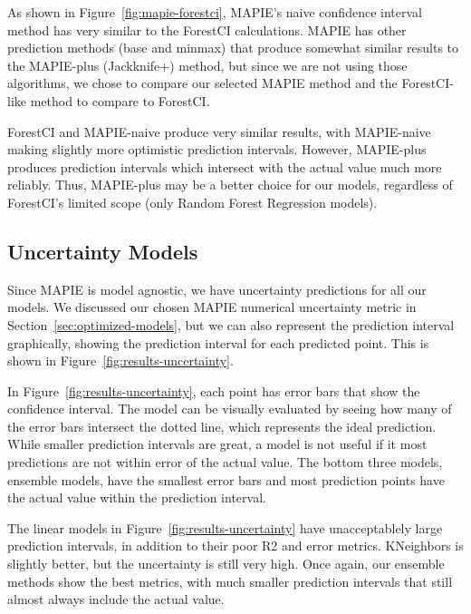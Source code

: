 \documentclass[twocolumn, nofootinbib, secnumarabic, amssymb, nobibnotes, aps, prd]{revtex4-2}
\begin{document}
As shown in Figure~\ref{fig:mapie-forestci}, MAPIE's naive confidence interval method has very similar to the ForestCI calculations. MAPIE has other prediction methods (base and minmax) that produce somewhat similar results to the MAPIE-plus (Jackknife+) method, but since we are not using those algorithms, we chose to compare our selected MAPIE method and the ForestCI-like method to compare to ForestCI.

ForestCI and MAPIE-naive produce very similar results, with MAPIE-naive making slightly more optimistic prediction intervals. However, MAPIE-plus produces prediction intervals which intersect with the actual value much more reliably. Thus, MAPIE-plus may be a better choice for our models, regardless of ForestCI's limited scope (only Random Forest Regression models).

\subsection{Uncertainty Models}
Since MAPIE is model agnostic, we have uncertainty predictions for all our models. We discussed our chosen MAPIE numerical uncertainty metric in Section~\ref{sec:optimized-models}, but we can also represent the prediction interval graphically, showing the prediction interval for each predicted point. This is shown in Figure~\ref{fig:results-uncertainty}.

In Figure~\ref{fig:results-uncertainty}, each point has error bars that show the confidence interval. The model can be visually evaluated by seeing how many of the error bars intersect the dotted line, which represents the ideal prediction. While smaller prediction intervals are great, a model is not useful if it most predictions are not within error of the actual value. The bottom three models, ensemble models, have the smallest error bars and most prediction points have the actual value within the prediction interval. 

The linear models in Figure~\ref{fig:results-uncertainty} have unacceptablely large prediction intervals, in addition to their poor R2 and error metrics. KNeighbors is slightly better, but the uncertainty is still very high. Once again, our ensemble methods show the best metrics, with much smaller prediction intervals that still almost always include the actual value.
\end{document}
